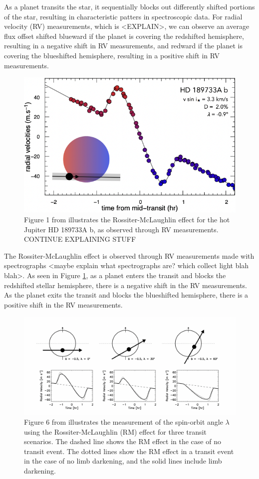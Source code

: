 \documentclass[oneside,12pt]{amsart}
\numberwithin{page}{section}
\begin{document}
As a planet transits the star, it sequentially blocks out differently shifted portions of the star, resulting in characteristic patters in spectroscopic data. For radial velocity (RV) measurements, which is <EXPLAIN>, we can observe an average flux offset shifted blueward if the planet is covering the redshifted hemisphere, resulting in a negative shift in RV measurements, and redward if the planet is covering the blueshifted hemisphere, resulting in a positive shift in RV measurements.

\begin{figure}
    \centering
    \includegraphics[width=0.8\linewidth]{figs/triaud_fig1.png}
    \caption{Figure 1 from \citep{triaud2017rossiter} illustrates the Rossiter-McLaughlin effect for the hot Jupiter HD 189733A b, as observed through RV measurements. CONTINUE EXPLAINING STUFF}
    \label{fig:triaud-fig1}
\end{figure}

The Rossiter-McLaughlin effect is observed through RV measurements made with spectrographs <maybe explain what spectrographs are? which collect light blah blah>. As seen in Figure \ref{fig:triaud-fig1}, as a planet enters the transit and blocks the redshifted stellar hemisphere, there is a negative shift in the RV measurements. As the planet exits the transit and blocks the blueshifted hemisphere, there is a positive shift in the RV measurements.

\begin{figure}[htbp]
    \centering
    \includegraphics[width=0.9\linewidth]{figs/winn_fig6.png}
    \caption{Figure 6 from \citet{winn2010transits} illustrates the measurement of the spin-orbit angle $\lambda$ using the Rossiter-McLaughlin (RM) effect for three transit scenarios. The dashed line shows the RM effect in the case of no transit event. The dotted lines show the RM effect in a transit event in the case of no limb darkening, and the solid lines include limb darkening.}
    \label{fig:winn-fig6}
\end{figure}
\end{document}
